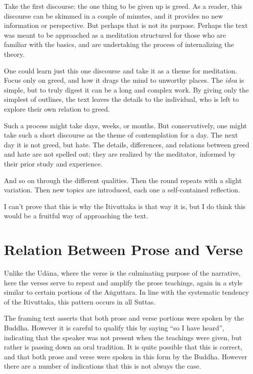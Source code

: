\documentclass[12pt,openany]{book}%
\begin{document}
Take the first discourse: the one thing to be given up is greed. As a reader, this discourse can be skimmed in a couple of minutes, and it provides no new information or perspective. But perhaps that is not its purpose. Perhaps the text was meant to be approached as a meditation structured for those who are familiar with the basics, and are undertaking the process of internalizing the theory.

One could learn just this one discourse and take it as a theme for meditation. Focus only on greed, and how it drags the mind to unworthy places. The \emph{idea} is simple, but to truly digest it can be a long and complex work. By giving only the simplest of outlines, the text leaves the details to the individual, who is left to explore their own relation to greed.

Such a process might take days, weeks, or months. But conservatively, one might take such a short discourse as the theme of contemplation for a day. The next day it is not greed, but hate. The details, differences, and relations between greed and hate are not spelled out; they are realized by the meditator, informed by their prior study and experience.

And so on through the different qualities. Then the round repeats with a slight variation. Then new topics are introduced, each one a self-contained reflection.

I can’t prove that this is why the Itivuttaka is that way it is, but I do think this would be a fruitful way of approaching the text.

\section*{Relation Between Prose and Verse}

Unlike the \textsanskrit{Udāna}, where the verse is the culminating purpose of the narrative, here the verses serve to repeat and amplify the prose teachings, again in a style similar to certain portions of the \textsanskrit{Aṅguttara}. In line with the systematic tendency of the Itivuttaka, this pattern occurs in all Suttas.

The framing text asserts that both prose and verse portions were spoken by the Buddha. However it is careful to qualify this by saying “so I have heard”, indicating that the speaker was not present when the teachings were given, but rather is passing down an oral tradition. It is quite possible that this is correct, and that both prose and verse were spoken in this form by the Buddha. However there are a number of indications that this is not always the case.
\end{document}
